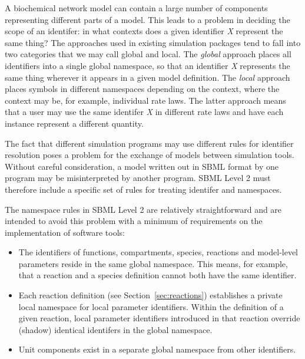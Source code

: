 \documentclass[10pt,twocolumntoc]{cekarticle}
\begin{document}
A biochemical network model can contain a large number of
components representing different parts of a model.  This leads to
a problem in deciding the scope of an identifer: in what contexts
does a given identifier \emph{X} represent the same thing?  The
approaches used in existing simulation packages tend to fall into
two categories that we may call global and local.  The
\emph{global} approach places all identifiers into a single global
namespace, so that an identifier \emph{X} represents the same thing
wherever it appears in a given model definition.  The \emph{local}
approach places symbols in different namespaces depending on the
context, where the context may be, for example, individual rate
laws.  The latter approach means that a user may use the same
identifer \emph{X} in different rate laws and have each instance
represent a different quantity.

The fact that different simulation programs may use different
rules for identifier resolution poses a problem for the exchange
of models between simulation tools.  Without careful
consideration, a model written out in SBML format by one program
may be misinterpreted by another program.  SBML Level 2 must
therefore include a specific set of rules for treating identifer
and namespaces.

The namespace rules in SBML Level 2 are relatively straightforward
and are intended to avoid this problem with a minimum of
requirements on the implementation of software tools:
\begin{itemize}

\item The identifiers of functions, compartments, species,
reactions and model-level parameters reside in the same global
namespace. This means, for example, that a reaction and a species
definition cannot both have the same identifier.

\item Each reaction definition (see Section~\ref{sec:reactions})
  establishes a private local namespace for local parameter identifiers. Within the
  definition of a given reaction, local parameter identifiers introduced in that
  reaction override (shadow) identical identifers in the global namespace.

\item Unit components exist in a separate global namespace from
other identifiers.

\end{itemize}
\end{document}
